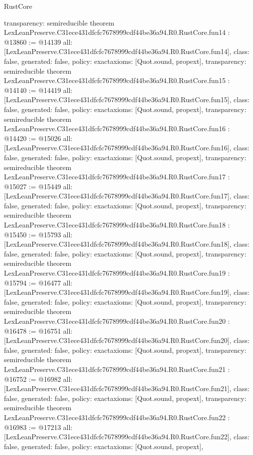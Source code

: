 \begin{lexlean}{RustCore}
\begin{coremodule}
{  transparency: semireducible
}
theorem LexLeanPreserve.C31ece431dfcfc7678999cdf44be36a94.R0.RustCore.fun14 : @13860 := @14139 {
  all: [LexLeanPreserve.C31ece431dfcfc7678999cdf44be36a94.R0.RustCore.fun14],
  class: false,
  generated: false,
  policy: exact{axioms: [Quot.sound, propext]},
  transparency: semireducible
}
theorem LexLeanPreserve.C31ece431dfcfc7678999cdf44be36a94.R0.RustCore.fun15 : @14140 := @14419 {
  all: [LexLeanPreserve.C31ece431dfcfc7678999cdf44be36a94.R0.RustCore.fun15],
  class: false,
  generated: false,
  policy: exact{axioms: [Quot.sound, propext]},
  transparency: semireducible
}
theorem LexLeanPreserve.C31ece431dfcfc7678999cdf44be36a94.R0.RustCore.fun16 : @14420 := @15026 {
  all: [LexLeanPreserve.C31ece431dfcfc7678999cdf44be36a94.R0.RustCore.fun16],
  class: false,
  generated: false,
  policy: exact{axioms: [Quot.sound, propext]},
  transparency: semireducible
}
theorem LexLeanPreserve.C31ece431dfcfc7678999cdf44be36a94.R0.RustCore.fun17 : @15027 := @15449 {
  all: [LexLeanPreserve.C31ece431dfcfc7678999cdf44be36a94.R0.RustCore.fun17],
  class: false,
  generated: false,
  policy: exact{axioms: [Quot.sound, propext]},
  transparency: semireducible
}
theorem LexLeanPreserve.C31ece431dfcfc7678999cdf44be36a94.R0.RustCore.fun18 : @15450 := @15793 {
  all: [LexLeanPreserve.C31ece431dfcfc7678999cdf44be36a94.R0.RustCore.fun18],
  class: false,
  generated: false,
  policy: exact{axioms: [Quot.sound, propext]},
  transparency: semireducible
}
theorem LexLeanPreserve.C31ece431dfcfc7678999cdf44be36a94.R0.RustCore.fun19 : @15794 := @16477 {
  all: [LexLeanPreserve.C31ece431dfcfc7678999cdf44be36a94.R0.RustCore.fun19],
  class: false,
  generated: false,
  policy: exact{axioms: [Quot.sound, propext]},
  transparency: semireducible
}
theorem LexLeanPreserve.C31ece431dfcfc7678999cdf44be36a94.R0.RustCore.fun20 : @16478 := @16751 {
  all: [LexLeanPreserve.C31ece431dfcfc7678999cdf44be36a94.R0.RustCore.fun20],
  class: false,
  generated: false,
  policy: exact{axioms: [Quot.sound, propext]},
  transparency: semireducible
}
theorem LexLeanPreserve.C31ece431dfcfc7678999cdf44be36a94.R0.RustCore.fun21 : @16752 := @16982 {
  all: [LexLeanPreserve.C31ece431dfcfc7678999cdf44be36a94.R0.RustCore.fun21],
  class: false,
  generated: false,
  policy: exact{axioms: [Quot.sound, propext]},
  transparency: semireducible
}
theorem LexLeanPreserve.C31ece431dfcfc7678999cdf44be36a94.R0.RustCore.fun22 : @16983 := @17213 {
  all: [LexLeanPreserve.C31ece431dfcfc7678999cdf44be36a94.R0.RustCore.fun22],
  class: false,
  generated: false,
  policy: exact{axioms: [Quot.sound, propext]},
}
\end{coremodule}
\end{lexlean}
